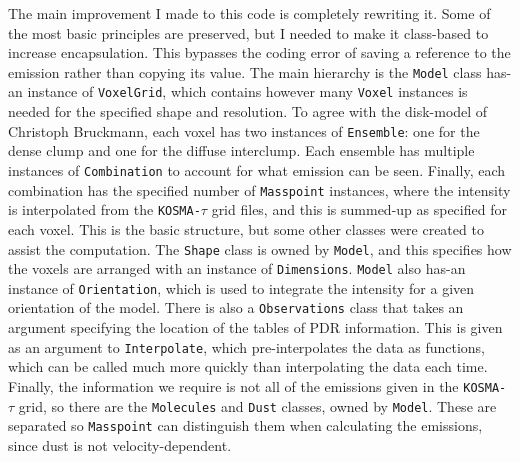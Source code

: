 \documentclass[onecolumn]{article}
\begin{document}
  The main improvement I made to this code is completely rewriting it. Some of the most basic principles are preserved, but I needed to make it class-based to increase encapsulation. This bypasses the coding error of saving a reference to the emission rather than copying its value. The main hierarchy is the \texttt{Model} class has-an instance of \texttt{VoxelGrid}, which contains however many \texttt{Voxel} instances is needed for the specified shape and resolution. To agree with the disk-model of Christoph Bruckmann, each voxel has two instances of \texttt{Ensemble}: one for the dense clump and one for the diffuse interclump. Each ensemble has multiple instances of \texttt{Combination} to account for what emission can be seen. Finally, each combination has the specified number of \texttt{Masspoint} instances, where the intensity is interpolated from the \texttt{KOSMA-$\tau$} grid files, and this is summed-up as specified for each voxel. This is the basic structure, but some other classes were created to assist the computation. The \texttt{Shape} class is owned by \texttt{Model}, and this specifies how the voxels are arranged with an instance of \texttt{Dimensions}. \texttt{Model} also has-an instance of \texttt{Orientation}, which is used to integrate the intensity for a given orientation of the model. There is also a \texttt{Observations} class that takes an argument specifying the location of the tables of PDR information. This is given as an argument to \texttt{Interpolate}, which pre-interpolates the data as functions, which can be called much more quickly than interpolating the data each time. Finally, the information we require is not all of the emissions given in the \texttt{KOSMA-$\tau$} grid, so there are the \texttt{Molecules} and \texttt{Dust} classes, owned by \texttt{Model}. These are separated so \texttt{Masspoint} can distinguish them when calculating the emissions, since dust is not velocity-dependent.
\end{document}
